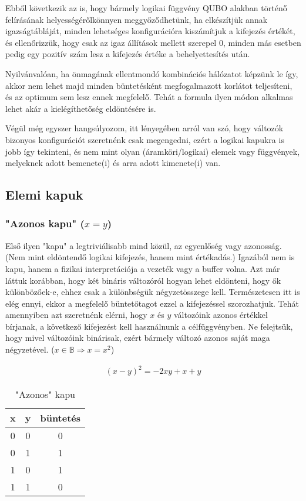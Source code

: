 Ebből következik az is, hogy bármely logikai függvény QUBO alakban történő felírásának helyességérőlkönnyen meggyőződhetünk, ha elkészítjük annak igazságtábláját, minden lehetséges konfigurációra kiszámítjuk a kifejezés értékét, és ellenőrizzük, hogy csak az igaz állítások mellett szerepel 0, minden más esetben pedig egy pozitív szám lesz a kifejezés értéke a behelyettesítés után.

Nyilvánvalóan, ha önmagának ellentmondó kombinációs hálózatot képzünk le így, akkor nem lehet majd minden büntetésként megfogalmazott korlátot teljesíteni, és az optimum sem lesz ennek megfelelő. Tehát a formula ilyen módon alkalmas lehet akár a kielégíthetőség eldöntésére is.

Végül még egyszer hangsúlyozom, itt lényegében arról van szó, hogy változók bizonyos konfigurációt szeretnénk csak megengedni, ezért a logikai kapukra is jobb így tekinteni, és nem mint olyan (áramköri/logikai) elemek vagy függvények, melyeknek adott bemenete(i) és arra adott kimenete(i) van.

\subsection{Elemi kapuk}

\subsubsection{"Azonos kapu" ($x=y$)}


Első ilyen "kapu" a legtriviálisabb mind közül, az egyenlőség vagy azonosság. (Nem mint eldöntendő logikai kifejezés, hanem mint értékadás.) Igazából nem is kapu, hanem a fizikai interpretációja a vezeték vagy a buffer volna. Azt már láttuk korábban, hogy két bináris változóról hogyan lehet eldönteni, hogy ők különbözőek-e, ehhez csak a különbségük négyzetösszege kell. Természetesen itt is elég ennyi, ekkor a megfelelő büntetőtagot ezzel a kifejezéssel szorozhatjuk. Tehát amennyiben azt szeretnénk elérni, hogy $x$ és $y$ változóink azonos értékkel bírjanak, a következő kifejezést kell használnunk a célfüggvényben. Ne felejtsük, hogy mivel változóink binárisak, ezért bármely változó azonos saját maga négyzetével. ($x \in \mathbb{B} \Rightarrow x = x^2$)

\begin{align}
	(x-y)^2=-2xy+x+y
\end{align}

\begin{table}[ht]
	\footnotesize
	\centering
	\begin{tabular}{ c c c }
		\toprule
		x & y & büntetés \\
		\midrule
		0 & 0 & 0 \\
		0 & 1 & 1 \\
		1 & 0 & 1 \\
		1 & 1 & 0 \\		
		\bottomrule
	\end{tabular}
	\caption{"Azonos" kapu}
	\label{tab:SAMEgate}
\end{table}

